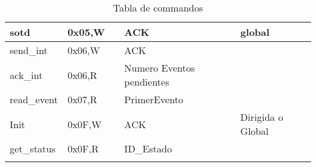 \begin{table}[h]
{\begin{tabular}{|l|l|l|l|l|}
            sotd             & 0x05,W         &                    & ACK                       & global                                                                                  \\ \hline{}
            send\_int        & 0x06,W         &                    & ACK                       &                                                                                         \\ \hline{}
            ack\_int         & 0x06,R         &                    & Numero Eventos pendientes &                                                                                         \\ \hline{}
            read\_event      & 0x07,R         &                    & PrimerEvento              &                                                                                         \\ \hline{}
            Init             & 0x0F,W         &                    & ACK                       & Dirigida o Global                                                                       \\ \hline{}
            get\_status      & 0x0F,R         &                    & ID\_Estado                &                                                                                         \\ \hline{}
        \end{tabular}
    }
    \caption{Tabla de commandos}
    \label{tab:Commands}
\end{table}

